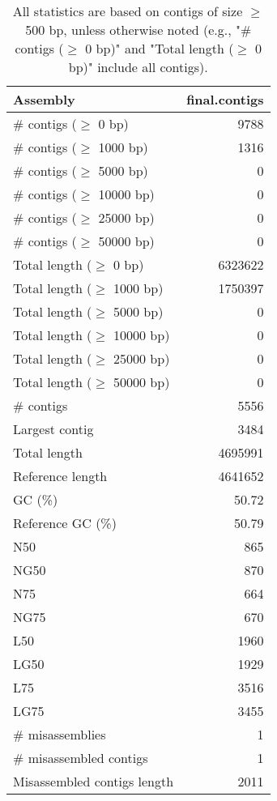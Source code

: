 \documentclass[12pt,a4paper]{article}
\begin{document}
\begin{table}[ht]
\begin{center}
\caption{All statistics are based on contigs of size $\geq$ 500 bp, unless otherwise noted (e.g., "\# contigs ($\geq$ 0 bp)" and "Total length ($\geq$ 0 bp)" include all contigs).}
\begin{tabular}{|l*{1}{|r}|}
\hline
Assembly & final.contigs \\ \hline
\# contigs ($\geq$ 0 bp) & 9788 \\ \hline
\# contigs ($\geq$ 1000 bp) & 1316 \\ \hline
\# contigs ($\geq$ 5000 bp) & 0 \\ \hline
\# contigs ($\geq$ 10000 bp) & 0 \\ \hline
\# contigs ($\geq$ 25000 bp) & 0 \\ \hline
\# contigs ($\geq$ 50000 bp) & 0 \\ \hline
Total length ($\geq$ 0 bp) & 6323622 \\ \hline
Total length ($\geq$ 1000 bp) & 1750397 \\ \hline
Total length ($\geq$ 5000 bp) & 0 \\ \hline
Total length ($\geq$ 10000 bp) & 0 \\ \hline
Total length ($\geq$ 25000 bp) & 0 \\ \hline
Total length ($\geq$ 50000 bp) & 0 \\ \hline
\# contigs & 5556 \\ \hline
Largest contig & 3484 \\ \hline
Total length & 4695991 \\ \hline
Reference length & 4641652 \\ \hline
GC (\%) & 50.72 \\ \hline
Reference GC (\%) & 50.79 \\ \hline
N50 & 865 \\ \hline
NG50 & 870 \\ \hline
N75 & 664 \\ \hline
NG75 & 670 \\ \hline
L50 & 1960 \\ \hline
LG50 & 1929 \\ \hline
L75 & 3516 \\ \hline
LG75 & 3455 \\ \hline
\# misassemblies & 1 \\ \hline
\# misassembled contigs & 1 \\ \hline
Misassembled contigs length & 2011 \\ \hline

\end{tabular}
\end{center}
\end{table}
\end{document}

